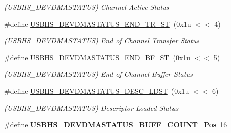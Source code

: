 \begin{DoxyCompactItemize}
\begin{DoxyCompactList}\small\item\em (U\+S\+B\+H\+S\+\_\+\+D\+E\+V\+D\+M\+A\+S\+T\+A\+T\+US) Channel Active Status \end{DoxyCompactList}\item 
\mbox{\label{group__SAMV71__USBHS_ga425d05279c0c14944268728e346015b0}} 
\#define \mbox{\hyperlink{group__SAMV71__USBHS_ga425d05279c0c14944268728e346015b0}{U\+S\+B\+H\+S\+\_\+\+D\+E\+V\+D\+M\+A\+S\+T\+A\+T\+U\+S\+\_\+\+E\+N\+D\+\_\+\+T\+R\+\_\+\+ST}}~(0x1u $<$$<$ 4)
\begin{DoxyCompactList}\small\item\em (U\+S\+B\+H\+S\+\_\+\+D\+E\+V\+D\+M\+A\+S\+T\+A\+T\+US) End of Channel Transfer Status \end{DoxyCompactList}\item 
\mbox{\label{group__SAMV71__USBHS_ga132996c11225849c258ce9718acb6ac9}} 
\#define \mbox{\hyperlink{group__SAMV71__USBHS_ga132996c11225849c258ce9718acb6ac9}{U\+S\+B\+H\+S\+\_\+\+D\+E\+V\+D\+M\+A\+S\+T\+A\+T\+U\+S\+\_\+\+E\+N\+D\+\_\+\+B\+F\+\_\+\+ST}}~(0x1u $<$$<$ 5)
\begin{DoxyCompactList}\small\item\em (U\+S\+B\+H\+S\+\_\+\+D\+E\+V\+D\+M\+A\+S\+T\+A\+T\+US) End of Channel Buffer Status \end{DoxyCompactList}\item 
\mbox{\label{group__SAMV71__USBHS_ga35b0093e492bed9ea99e21a1cbd3d2ad}} 
\#define \mbox{\hyperlink{group__SAMV71__USBHS_ga35b0093e492bed9ea99e21a1cbd3d2ad}{U\+S\+B\+H\+S\+\_\+\+D\+E\+V\+D\+M\+A\+S\+T\+A\+T\+U\+S\+\_\+\+D\+E\+S\+C\+\_\+\+L\+D\+ST}}~(0x1u $<$$<$ 6)
\begin{DoxyCompactList}\small\item\em (U\+S\+B\+H\+S\+\_\+\+D\+E\+V\+D\+M\+A\+S\+T\+A\+T\+US) Descriptor Loaded Status \end{DoxyCompactList}\item 
\mbox{\label{group__SAMV71__USBHS_ga988543f1a187b28d82e02a88465a023b}} 
\#define {\bfseries U\+S\+B\+H\+S\+\_\+\+D\+E\+V\+D\+M\+A\+S\+T\+A\+T\+U\+S\+\_\+\+B\+U\+F\+F\+\_\+\+C\+O\+U\+N\+T\+\_\+\+Pos}~16
\item 
\mbox{\label{group__SAMV71__USBHS_ga6441367716baec1f6e76bb93f74fde59}} 
$$
\end{DoxyCompactItemize}
